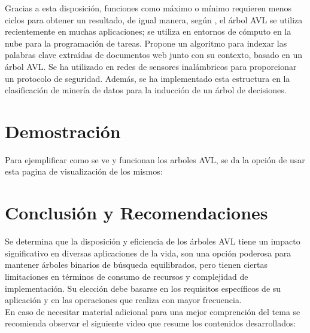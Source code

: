 \documentclass[journal]{IEEEtran}
\begin{document}
Gracias a esta disposición, funciones como máximo o mínimo requieren menos ciclos para obtener un resultado, de igual manera, según \cite{AVL Aplications}, el árbol AVL se utiliza recientemente en muchas aplicaciones; se utiliza en entornos de cómputo en la nube para la programación de tareas. \cite{web index} Propone un algoritmo para indexar las palabras clave extraídas de documentos web junto con su contexto, basado en un árbol AVL. Se ha utilizado en redes de sensores inalámbricos para proporcionar un protocolo de seguridad. Además, se ha implementado esta estructura en la clasificación de minería de datos para la inducción de un árbol de decisiones.

\section{Demostración}
Para ejemplificar como se ve y funcionan los arboles AVL,
se da la opción de usar esta pagina de visualización de los mismos: \cite{Demostracion}

\section{Conclusión y Recomendaciones}
Se determina que la disposición y eficiencia de los árboles AVL tiene un impacto significativo en diversas aplicaciones de la vida, son una opción poderosa para mantener árboles binarios de búsqueda equilibrados, pero tienen ciertas limitaciones en términos de consumo de recursos y complejidad de implementación. Su elección debe basarse en los requisitos específicos de su aplicación y en las operaciones que realiza con mayor frecuencia.\\

En caso de necesitar material adicional para una mejor comprención del tema se recomienda observar el siguiente video que resume los contenidos desarrollados: \cite{video}

\end{document}
